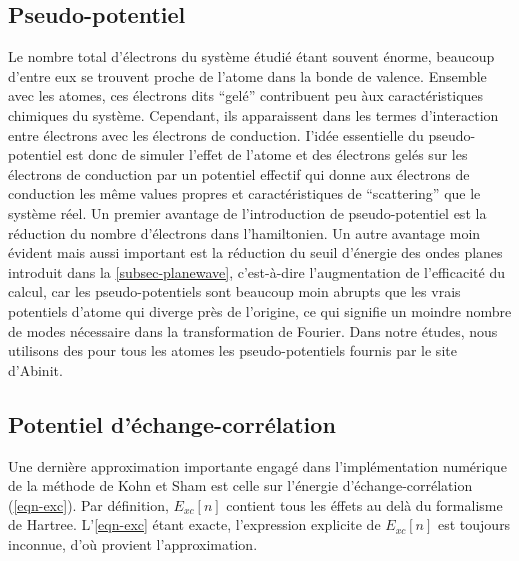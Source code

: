 \subsection{Pseudo-potentiel}
\label{subsec-pseudo}
Le nombre total d'électrons du système étudié étant souvent énorme,
beaucoup d'entre eux se trouvent proche de l'atome dans la bonde de valence.
Ensemble avec les atomes, ces électrons dits ``gelé'' contribuent peu àux caractéristiques chimiques du système.
Cependant, ils apparaissent dans les termes d'interaction entre électrons avec les électrons de conduction.
I'idée essentielle du pseudo-potentiel est donc de simuler l'effet de l'atome et des électrons gelés
sur les électrons de conduction par un potentiel effectif qui donne aux électrons de conduction
les même values propres et caractéristiques de ``scattering'' que le système réel.
Un premier avantage de l'introduction de pseudo-potentiel est la réduction du nombre d'électrons dans l'hamiltonien.
Un autre avantage moin évident mais aussi important est la réduction du seuil d'énergie des ondes planes introduit dans la \cref{subsec-planewave},
c'est-à-dire l'augmentation de l'efficacité du calcul, car les pseudo-potentiels sont beaucoup moin abrupts
que les vrais potentiels d'atome qui diverge près de l'origine,
ce qui signifie un moindre nombre de modes nécessaire dans la transformation de Fourier.
Dans notre études, nous utilisons des pour tous les atomes les pseudo-potentiels fournis par le site d'Abinit. %

\subsection{Potentiel d'échange-corrélation}
\label{subsec-xc}
Une dernière approximation importante engagé dans l'implémentation numérique
de la méthode de Kohn et Sham est celle sur l'énergie d'échange-corrélation (\cref{eqn-exc}).
Par définition, $E_{xc}[n]$ contient tous les éffets au delà du formalisme de Hartree.
L'\cref{eqn-exc} étant exacte, l'expression explicite de $E_{xc}[n]$ est toujours inconnue,
d'où provient l'approximation.

